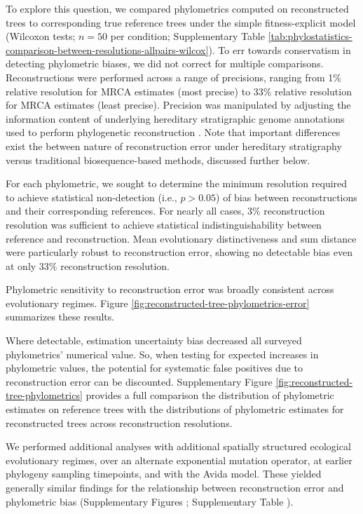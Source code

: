 To explore this question, we compared phylometrics computed on reconstructed trees to corresponding true reference trees under the simple fitness-explicit model (Wilcoxon tests; $n=50$ per condition; Supplementary Table \ref{tab:phylostatistics-comparison-between-resolutions-allpairs-wilcox}).
To err towards conservatism in detecting phylometric biases, we did not correct for multiple comparisons.
Reconstructions were performed across a range of precisions, ranging from 1\% relative resolution for MRCA estimates (most precise) to 33\% relative resolution for MRCA estimates (least precise).
Precision was manipulated by adjusting the information content of underlying hereditary stratigraphic genome annotations used to perform phylogenetic reconstruction \citep{moreno2022hereditary}.
Note that important differences exist the between nature of reconstruction error under hereditary stratigraphy versus traditional biosequence-based methods, discussed further below.



For each phylometric, we sought to determine the minimum resolution required to achieve statistical non-detection (i.e., $p > 0.05$) of bias between reconstructions and their corresponding references.
For nearly all cases, 3\% reconstruction resolution was sufficient to achieve statistical indistinguishability between reference and reconstruction.
Mean evolutionary distinctiveness and sum distance were particularly robust to reconstruction error, showing no detectable bias even at only 33\% reconstruction resolution.

Phylometric sensitivity to reconstruction error was broadly consistent across evolutionary regimes.
Figure \ref{fig:reconstructed-tree-phylometrics-error} summarizes these results.

Where detectable, estimation uncertainty bias decreased all surveyed phylometrics' numerical value.
So, when testing for expected increases in phylometric values, the potential for systematic false positives due to reconstruction error can be discounted.
Supplementary Figure \ref{fig:reconstructed-tree-phylometrics} provides a full comparison the distribution of phylometric estimates on reference trees with the distributions of phylometric estimates for reconstructed trees across reconstruction resolutions.

We performed additional analyses with additional spatially structured ecological evolutionary regimes, over an alternate exponential mutation operator, at earlier phylogeny sampling timepoints, and with the Avida model.
These yielded generally similar findings for the relationship between reconstruction error and phylometric bias (Supplementary Figures ; Supplementary Table ).

